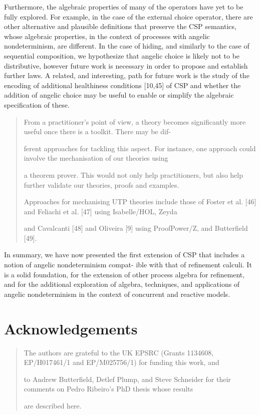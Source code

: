 \documentclass[11pt]{article}
\begin{document}
Furthermore, the algebraic properties of many of the operators have yet to be fully explored. For example, in the case of the external choice operator, there are other alternative and plausible definitions that preserve the CSP semantics, whose algebraic properties, in the context of processes with angelic nondeterminism, are different. In the case of hiding, and similarly to the case of sequential composition, we hypothesize that angelic choice is likely not to be distributive, however future work is necessary in order to propose and establish further laws. A related, and interesting, path for future work is the study of the encoding of additional healthiness conditions [10,45] of CSP and whether the addition of angelic choice may be useful to enable or simplify the algebraic specification of these.

\begin{quote}\small\raggedright
From a practitioner’s point of view, a theory becomes significantly more useful once there is a toolkit. There may be dif-
\par
ferent approaches for tackling this aspect. For instance, one approach could involve the mechanisation of our theories using
\par
a theorem prover. This would not only help practitioners, but also help further validate our theories, proofs and examples.
\par
Approaches for mechanising UTP theories include those of Foster et al. [46] and Feliachi et al. [47] using Isabelle/HOL, Zeyda
\par
and Cavalcanti [48] and Oliveira [9] using ProofPower/Z, and Butterfield [49].
\end{quote}

In summary, we have now presented the first extension of CSP that includes a notion of angelic nondeterminism compat- ible with that of refinement calculi. It is a solid foundation, for the extension of other process algebra for refinement, and for the additional exploration of algebra, techniques, and applications of angelic nondeterminism in the context of concurrent and reactive models.

\section*{Acknowledgements}
\begin{quote}\small\raggedright
The authors are grateful to the UK EPSRC (Grants 1134608, EP/H017461/1 and EP/M025756/1) for funding this work, and
\par
to Andrew Butterfield, Detlef Plump, and Steve Schneider for their comments on Pedro Ribeiro’s PhD thesis whose results
\par
are described here.
\end{quote}
\end{document}
